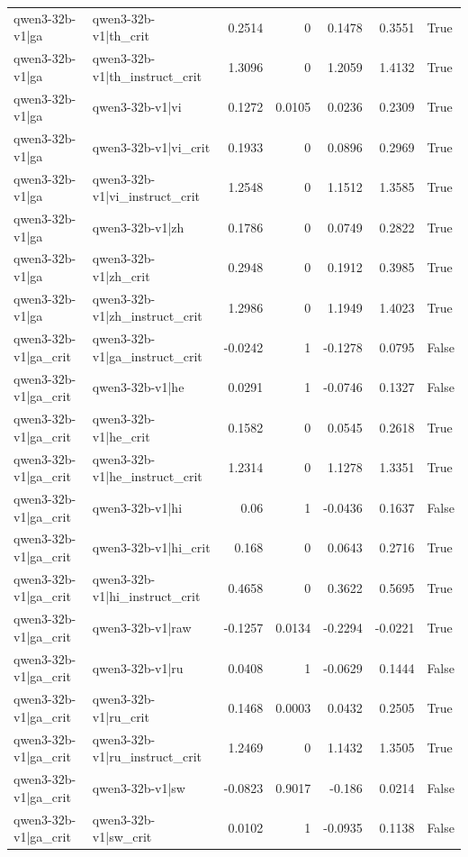 \begin{table}
\begin{tabular}{l l r r r r l}
qwen3-32b-v1|ga & qwen3-32b-v1|th_crit & 0.2514 & 0 & 0.1478 & 0.3551 & True \\
qwen3-32b-v1|ga & qwen3-32b-v1|th_instruct_crit & 1.3096 & 0 & 1.2059 & 1.4132 & True \\
qwen3-32b-v1|ga & qwen3-32b-v1|vi & 0.1272 & 0.0105 & 0.0236 & 0.2309 & True \\
qwen3-32b-v1|ga & qwen3-32b-v1|vi_crit & 0.1933 & 0 & 0.0896 & 0.2969 & True \\
qwen3-32b-v1|ga & qwen3-32b-v1|vi_instruct_crit & 1.2548 & 0 & 1.1512 & 1.3585 & True \\
qwen3-32b-v1|ga & qwen3-32b-v1|zh & 0.1786 & 0 & 0.0749 & 0.2822 & True \\
qwen3-32b-v1|ga & qwen3-32b-v1|zh_crit & 0.2948 & 0 & 0.1912 & 0.3985 & True \\
qwen3-32b-v1|ga & qwen3-32b-v1|zh_instruct_crit & 1.2986 & 0 & 1.1949 & 1.4023 & True \\
qwen3-32b-v1|ga_crit & qwen3-32b-v1|ga_instruct_crit & -0.0242 & 1 & -0.1278 & 0.0795 & False \\
qwen3-32b-v1|ga_crit & qwen3-32b-v1|he & 0.0291 & 1 & -0.0746 & 0.1327 & False \\
qwen3-32b-v1|ga_crit & qwen3-32b-v1|he_crit & 0.1582 & 0 & 0.0545 & 0.2618 & True \\
qwen3-32b-v1|ga_crit & qwen3-32b-v1|he_instruct_crit & 1.2314 & 0 & 1.1278 & 1.3351 & True \\
qwen3-32b-v1|ga_crit & qwen3-32b-v1|hi & 0.06 & 1 & -0.0436 & 0.1637 & False \\
qwen3-32b-v1|ga_crit & qwen3-32b-v1|hi_crit & 0.168 & 0 & 0.0643 & 0.2716 & True \\
qwen3-32b-v1|ga_crit & qwen3-32b-v1|hi_instruct_crit & 0.4658 & 0 & 0.3622 & 0.5695 & True \\
qwen3-32b-v1|ga_crit & qwen3-32b-v1|raw & -0.1257 & 0.0134 & -0.2294 & -0.0221 & True \\
qwen3-32b-v1|ga_crit & qwen3-32b-v1|ru & 0.0408 & 1 & -0.0629 & 0.1444 & False \\
qwen3-32b-v1|ga_crit & qwen3-32b-v1|ru_crit & 0.1468 & 0.0003 & 0.0432 & 0.2505 & True \\
qwen3-32b-v1|ga_crit & qwen3-32b-v1|ru_instruct_crit & 1.2469 & 0 & 1.1432 & 1.3505 & True \\
qwen3-32b-v1|ga_crit & qwen3-32b-v1|sw & -0.0823 & 0.9017 & -0.186 & 0.0214 & False \\
qwen3-32b-v1|ga_crit & qwen3-32b-v1|sw_crit & 0.0102 & 1 & -0.0935 & 0.1138 & False \\

\end{tabular}
\end{table}
